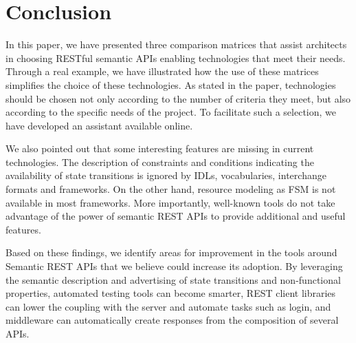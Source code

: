 \section{Conclusion}
In this paper, we have presented three comparison matrices that assist architects in choosing RESTful semantic APIs enabling technologies that meet their needs.
Through a real example, we have illustrated how the use of these matrices simplifies the choice of these technologies. 
As stated in the paper, technologies should be chosen not only according to the number of criteria they meet, but also according to the specific needs of the project. 
To facilitate such a selection, we have developed an assistant available online.

We also pointed out that some interesting features are missing in current technologies.
The description of constraints and conditions indicating the availability of state transitions is ignored by IDLs, vocabularies, interchange formats and frameworks. On the other hand, resource modeling as FSM is not available in most frameworks.
More importantly, well-known tools do not take advantage of the power of semantic REST APIs to provide additional and useful features.

Based on these findings, we identify areas for improvement in the tools around Semantic REST APIs that we believe could increase its adoption. By leveraging the semantic description and advertising of state transitions and non-functional properties, automated testing tools can become smarter, REST client libraries can lower the coupling with the server and automate tasks such as login, and middleware can automatically create responses from the composition of several APIs.